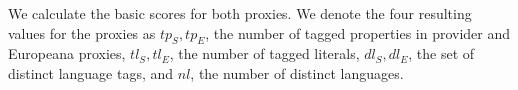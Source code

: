 


\noindent We calculate the basic scores for both proxies.
We denote the four resulting values for the proxies as $tp_S, tp_E$, the number of tagged properties in provider and Europeana proxies, $tl_S, tl_E$, the number of tagged literals, $dl_S, dl_E$, the set of distinct language tags, and $nl$, the number of distinct languages. 


